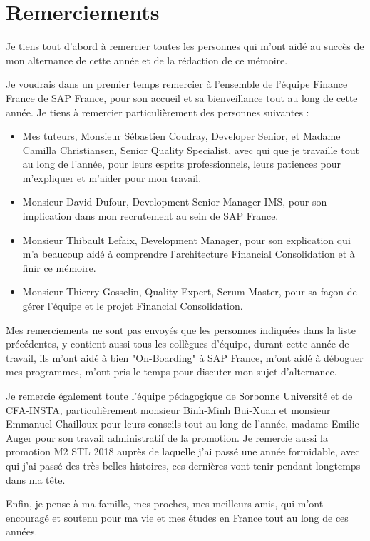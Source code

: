 \section{Remerciements}
Je tiens tout d'abord à remercier toutes les personnes qui m'ont aidé au succès de mon alternance de cette année et de la rédaction de ce mémoire.

\par Je voudrais dans un premier temps remercier à l'ensemble de l'équipe Finance France de SAP France, pour son accueil et sa bienveillance tout au long de cette année. Je tiens à remercier particulièrement des personnes suivantes : 
\begin{itemize}
    \item Mes tuteurs, Monsieur Sébastien Coudray, Developer Senior, et Madame Camilla Christiansen, Senior Quality Specialist, avec qui que je travaille tout au long de l'année, pour leurs esprits professionnels, leurs patiences pour m'expliquer et m'aider pour mon travail.
    \item Monsieur David Dufour, Development Senior Manager IMS, pour son implication dans mon recrutement au sein de SAP France.
    \item Monsieur Thibault Lefaix, Development Manager, pour son explication qui m'a beaucoup aidé à comprendre l'architecture Financial Consolidation et à finir ce mémoire.
    \item Monsieur Thierry Gosselin, Quality Expert, Scrum Master, pour sa façon de gérer l'équipe et le projet Financial Consolidation.
\end{itemize}

\par Mes remerciements ne sont pas envoyés que les personnes indiquées dans la liste précédentes, y contient aussi tous les collègues d'équipe, durant cette année de travail, ils m'ont aidé à bien "On-Boarding" à SAP France, m'ont aidé à déboguer mes programmes, m'ont pris le temps pour discuter mon sujet d'alternance. 

\par Je remercie également toute l'équipe pédagogique de Sorbonne Université et de CFA-INSTA, particulièrement monsieur Binh-Minh Bui-Xuan et monsieur Emmanuel Chailloux pour leurs conseils
tout au long de l’année, madame Emilie Auger pour son travail administratif de la promotion. Je remercie aussi la promotion M2 STL 2018 auprès de laquelle j’ai passé une année formidable, avec qui j'ai passé des très belles histoires, ces dernières vont tenir pendant longtemps dans ma tête.

\par Enfin, je pense à ma famille, mes proches, mes meilleurs amis, qui m'ont encouragé et soutenu pour ma vie et mes études en France tout au long de ces années.

